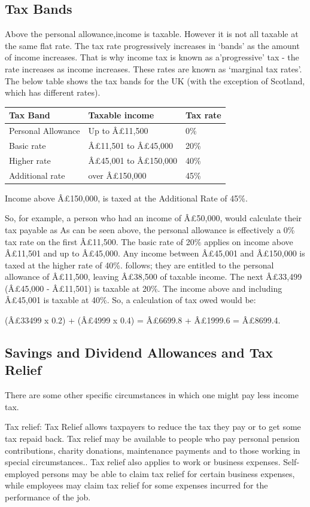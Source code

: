 \documentclass[]{tufte-handout}
\begin{document}
\hypertarget{tax-bands}{%
\subsection{Tax Bands}\label{tax-bands}}

Above the personal allowance,income is taxable. However it is not all
taxable at the same flat rate. The tax rate progressively increases in
`bands' as the amount of income increases. That is why income tax is
known as a'progressive' tax - the rate increases as income increases.
These rates are known as `marginal tax rates'. The below table shows the
tax bands for the UK (with the exception of Scotland, which has
different rates).

\begin{longtable}[]{@{}lll@{}}
\toprule
Tax Band & Taxable income & Tax rate\tabularnewline
\midrule
\endhead
Personal Allowance & Up to Â£11,500 & 0\%\tabularnewline
Basic rate & Â£11,501 to Â£45,000 & 20\%\tabularnewline
Higher rate & Â£45,001 to Â£150,000 & 40\%\tabularnewline
Additional rate & over Â£150,000 & 45\%\tabularnewline
\bottomrule
\end{longtable}

Income above Â£150,000, is taxed at the Additional Rate of 45\%.

So, for example, a person who had an income of Â£50,000, would calculate
their tax payable as As can be seen above, the personal allowance is
effectively a 0\% tax rate on the first Â£11,500. The basic rate of 20\%
applies on income above Â£11,501 and up to Â£45,000. Any income between
Â£45,001 and Â£150,000 is taxed at the higher rate of 40\%. follows;
they are entitled to the personal allowance of Â£11,500, leaving
Â£38,500 of taxable income. The next Â£33,499 (Â£45,000 - Â£11,501) is
taxable at 20\%. The income above and including Â£45,001 is taxable at
40\%. So, a calculation of tax owed would be:

(Â£33499 x 0.2) + (Â£4999 x 0.4) = Â£6699.8 + Â£1999.6 = Â£8699.4.

\hypertarget{savings-and-dividend-allowances-and-tax-relief}{%
\subsection{Savings and Dividend Allowances and Tax
Relief}\label{savings-and-dividend-allowances-and-tax-relief}}

There are some other specific circumstances in which one might pay less
income tax.

Tax relief: Tax Relief allows taxpayers to reduce the tax they pay or to
get some tax repaid back. Tax relief may be available to people who pay
personal pension contributions, charity donations, maintenance payments
and to those working in special circumstances.. Tax relief also applies
to work or business expenses. Self-employed persons may be able to claim
tax relief for certain business expenses, while employees may claim tax
relief for some expenses incurred for the performance of the job.
\end{document}

